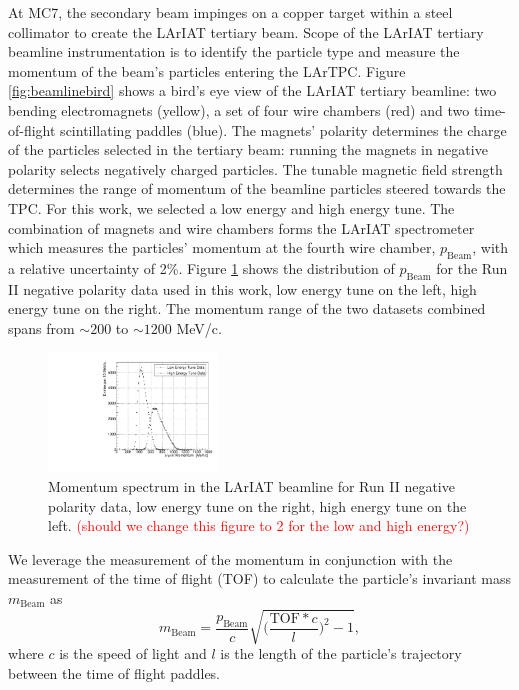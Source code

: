 \documentclass[aps,prl,twocolumn,showpacs,superscriptaddress,groupedaddress]{revtex4}  %
\begin{document}
At MC7, the secondary beam impinges  on a copper target within a steel collimator to create the LArIAT tertiary beam. Scope of the LArIAT tertiary beamline instrumentation is to identify the particle type and measure the momentum of the beam's particles entering the LArTPC. Figure \ref{fig:beamlinebird} shows a bird's eye view of the LArIAT tertiary beamline:  two bending electromagnets (yellow), a set of four wire chambers (red) and two time-of-flight scintillating paddles (blue).  The magnets' polarity determines the charge of the particles selected in the tertiary beam: running the magnets in negative polarity selects negatively charged particles. The tunable magnetic field strength determines the range of momentum of the beamline particles steered towards the TPC. For this work, we selected a low energy and high energy tune. 
The combination of magnets and wire chambers forms the LArIAT spectrometer which measures the particles' momentum at the fourth wire chamber, $p_{\text{Beam}}$, with a relative uncertainty of 2\%. Figure \ref{fig:momentum} shows the distribution of  $p_{\text{Beam}}$ for the Run II negative polarity data used in this work, low energy tune on the left, high energy tune on the right. The momentum range of the two datasets combined spans from $\sim200$ to $\sim1200$ MeV/c. 
\begin{figure}
  \centering  
\includegraphics[width =0.4\textwidth]{momentumPiMuE.pdf}
\caption{Momentum spectrum in the LArIAT beamline  for Run II negative polarity data, low energy tune on the right, high energy tune on the left. \textcolor{red}{(should we change this figure to 2 for the low and high energy?)}}
\label{fig:momentum}
\end{figure}



We leverage the measurement of the momentum in conjunction with the measurement of the time of flight (TOF) to calculate the particle's invariant mass $m_{\text{Beam}}$ as 
\begin{equation}
m_{\text{Beam}} = \frac{p_{\text{Beam}}}{c}\sqrt{\biggl(\frac{\text{TOF}*c}{l}\biggr)^2 -1},
\label{eq:mass}
\end{equation}
 where $c$ is the speed of light and $l$ is the length of the particle's trajectory between the time of flight paddles. 
\end{document}
